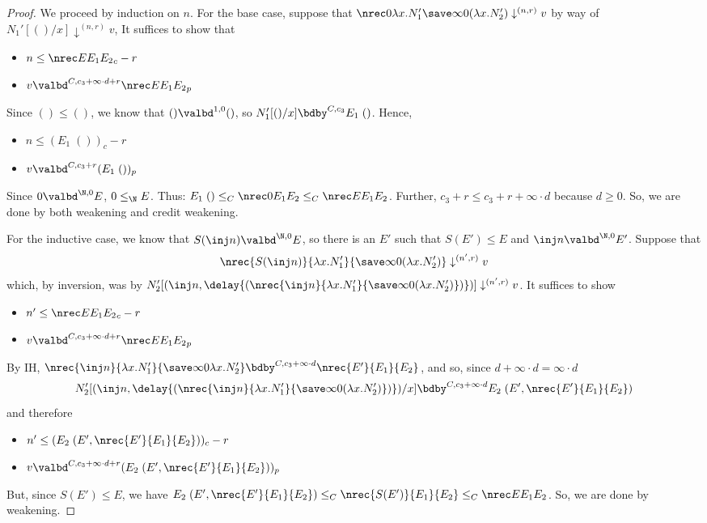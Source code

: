 \begin{proof}
We proceed by induction on $n$. For the base case, suppose that $\nrec 0 {\lambda x.N_1'} {\save \infty 0 (\lambda x.N_2')} \downarrow^{(n,r)} v$ by way of $N_1'[()/x] \downarrow^{(n,r)} v$, It suffices to show that
\begin{itemize}
  \item $n \leq \nrec E {E_1} {E_2}_c - r$
  \item $v \valbd^{C,c_3 + \infty \cdot d + r} \nrec E {E_1} {E_2}_p$
\end{itemize}
Since $() \leq ()$, we know that $() \valbd^{1,0} ()$, so $N_1'[()/x] \bdby^{C,c_3} E_1 \; ()$. Hence,
\begin{itemize}
  \item $n \leq (E_1 \; ())_c - r$
  \item $v \valbd^{C,c_3 + r} (E_1 \; ())_p$
\end{itemize}
Since $0 \valbd^{\N,0} E$, $0 \leq_\N E$. Thus: $E_1 \; () \leq_C \nrec 0 {E_1} {E_2} \leq_C \nrec E {E_1} {E_2}$. Further, $c_3 + r \leq c_3 + r + \infty \cdot d$ because $d \geq 0$.
So, we are done by both weakening and credit weakening.

For the inductive case, we know that $S(\inj n) \valbd^{\N,0} E$, so there is an $E'$ such that $S(E') \leq E$ and $\inj n \valbd^{\N,0} E'$.
Suppose that $$\nrec {S(\inj n)} {\lambda x.N_1'} {\save \infty 0 (\lambda x.N_2')} \downarrow^{(n',r)} v$$ which, by inversion, was by $N_2'[(\inj n,\delay {(\nrec {\inj n} {\lambda x.N_1'} {\save \infty 0 (\lambda x.N_2')})})] \downarrow^{(n',r)} v$. It suffices to show
\begin{itemize}
  \item $n' \leq \nrec E {E_1} {E_2}_c - r$
  \item $v \valbd^{C,c_3 + \infty \cdot d + r} \nrec E {E_1} {E_2}_p$
\end{itemize}
By IH, $\nrec {\inj n} {\lambda x.N_1'} {\save \infty 0 {\lambda x.N_2'}} \bdby^{C,c_3 + \infty \cdot d} \nrec {E'} {E_1} {E_2}$,
and so, since $d + \infty \cdot d = \infty \cdot d$
$$
N_2'[(\inj n,\delay{(\nrec {\inj n} {\lambda x.N_1'} {\save \infty 0 {(\lambda x.N_2')}} )})/x] \bdby^{C,c_3 + \infty \cdot d} E_2 \; (E',\nrec {E'} {E_1} {E_2})
$$
and therefore
\begin{itemize}
  \item $n' \leq (E_2 \; (E',\nrec {E'} {E_1} {E_2}))_c - r$
  \item $v \valbd^{C,c_3 + \infty \cdot d + r} (E_2 \; (E',\nrec {E'} {E_1} {E_2}))_p$
\end{itemize}
But, since $S(E') \leq E$, we have $E_2 \; (E',\nrec {E'} {E_1} {E_2}) \leq_C \nrec {S(E')} {E_1} {E_2} \leq_C \nrec E {E_1} {E_2}$. So, we are done by weakening.
\end{proof}
